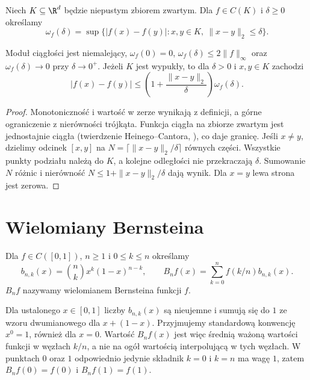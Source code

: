 \begin{definicja}
\label{ma2:def:approx-modulus}
Niech $K\subseteq\R^d$ będzie niepustym zbiorem
zwartym. Dla $f\in C(K)$ i $\delta\ge0$ określamy
\[
 \omega_f(\delta)=
 \sup\{|f(x)-f(y)|:x,y\in K,\ \|x-y\|_2\le\delta\}.
\]
\end{definicja}

\begin{stwierdzenie}
\label{ma2:prop:approx-modulus}
Moduł ciągłości jest niemalejący,
$\omega_f(0)=0$, $\omega_f(\delta)\le2\|f\|_\infty$
oraz $\omega_f(\delta)\to0$ przy $\delta\to0^+$.
Jeżeli $K$ jest wypukły, to dla $\delta>0$
i $x,y\in K$ zachodzi
\[
 |f(x)-f(y)|\le
 \left(1+\frac{\|x-y\|_2}{\delta}\right)\omega_f(\delta).
\]
\end{stwierdzenie}
\begin{proof}
Monotoniczność i wartość w zerze wynikają
z definicji, a górne ograniczenie z nierówności
trójkąta. Funkcja ciągła na zbiorze zwartym
jest jednostajnie ciągła (twierdzenie Heinego--Cantora,
), co daje granicę.
Jeśli $x\ne y$, dzielimy odcinek $[x,y]$
na $N=\lceil\|x-y\|_2/\delta\rceil$ równych
części. Wszystkie punkty podziału należą do $K$,
a kolejne odległości nie przekraczają $\delta$.
Sumowanie $N$ różnic i nierówność
$N\le1+\|x-y\|_2/\delta$ dają wynik.
Dla $x=y$ lewa strona jest zerowa.
\end{proof}

\section{Wielomiany Bernsteina}

\begin{definicja}
\label{ma2:def:approx-bernstein}
Dla $f\in C([0,1])$, $n\ge1$ i $0\le k\le n$
określamy
\[
 b_{n,k}(x)=\binom nk x^k(1-x)^{n-k},\qquad
 B_nf(x)=\sum_{k=0}^n f(k/n)b_{n,k}(x).
\]
$B_nf$ nazywamy wielomianem Bernsteina funkcji $f$.
\end{definicja}

Dla ustalonego $x\in[0,1]$ liczby $b_{n,k}(x)$
są nieujemne i sumują się do $1$ ze wzoru
dwumianowego dla $x+(1-x)$. Przyjmujemy
standardową konwencję $x^0=1$, również dla $x=0$.
Wartość $B_nf(x)$ jest więc średnią ważoną
wartości funkcji w węzłach $k/n$, a nie
na ogół wartością interpolującą w tych węzłach.
W punktach $0$ oraz $1$ odpowiednio jedynie
składnik $k=0$ i $k=n$ ma wagę $1$,
zatem $B_nf(0)=f(0)$ i $B_nf(1)=f(1)$.

